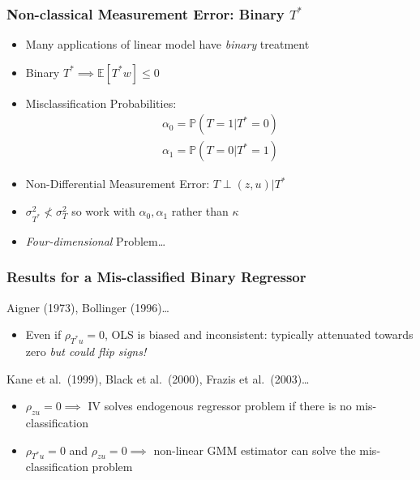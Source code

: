 \documentclass{beamer}
\begin{document}
\begin{frame}
  \frametitle{Non-classical Measurement Error: Binary $T^*$}
  \begin{itemize}
    \item Many applications of linear model have \emph{binary} treatment
    \item Binary $T^* \implies \mathbb{E}[T^*w]\leq0$
    \item Misclassification Probabilities:
      \begin{eqnarray*}
        \alpha_0 = \mathbb{P}(T=1|T^*=0)\\
        \alpha_1 = \mathbb{P}(T=0|T^*=1)
      \end{eqnarray*}
    \item Non-Differential Measurement Error: $T\perp (z,u)|T^*$
    \item  $\sigma_{T^*}^2 \nless \sigma_{T}^2$ so work with $\alpha_0, \alpha_1$ rather than $\kappa$ 
    \item \emph{Four-dimensional} Problem\ldots
  \end{itemize}
\end{frame}
\begin{frame}
  \frametitle{Results for a Mis-classified Binary Regressor}
  \begin{block}{Aigner (1973), Bollinger (1996)\ldots}
    \begin{itemize}
      \item Even if $\rho_{T^*u}=0$, OLS is biased and inconsistent: typically attenuated towards zero \emph{but could flip signs!} 
    \end{itemize}
  \end{block}
  \begin{block}{Kane et al.\ (1999), Black et al.\ (2000), Frazis et al.\ (2003)\ldots}
    \begin{itemize}
      \item $\rho_{zu}=0 \implies$ IV solves endogenous regressor problem if there is no mis-classification
      \item $\rho_{T^*u}=0$ and $\rho_{zu}=0 \implies$ non-linear GMM estimator can solve the mis-classification problem
    \end{itemize}
  \end{block}
\end{frame}
\end{document}
